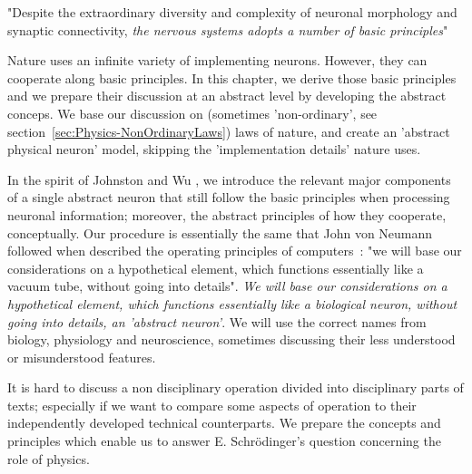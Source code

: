 
\quotationbox
{"Despite the extraordinary diversity and complexity of neuronal morphology and synaptic connectivity,
\textit{the nervous systems adopts a number of
 basic principles}"~\cite{JohnstonWuNeurophysiology:1995}
}


Nature uses an infinite variety of implementing neurons.
However, they can cooperate along basic principles.
In this chapter, we derive those basic principles and we prepare their discussion at an abstract level
by developing the abstract conceps.
We base our discussion on (sometimes 'non-ordinary',
see section~\ref{sec:Physics-NonOrdinaryLaws}) laws of nature,
and create an 'abstract physical neuron' model,
skipping the 'implementation details' nature uses.




In the spirit of Johnston and Wu \cite{JohnstonWuNeurophysiology:1995},
we introduce the relevant major components of a single abstract neuron that still follow the
{basic principles} when processing neuronal information;
moreover, the abstract principles of how they cooperate, conceptually.
Our procedure is essentially the same that John von Neumann followed
when described the operating principles of computers~\cite{EDVACreport1945}:
"we will base our considerations on a hypothetical element, which functions
essentially like a vacuum tube, without going into details". 
\textit{We will base our considerations on a hypothetical element, which functions
essentially like a biological neuron, without going into details, an 'abstract neuron'}. We will use the correct names from biology, physiology and neuroscience, sometimes discussing their less understood or misunderstood features.


It is hard to discuss a non disciplinary operation divided
into disciplinary parts of texts; especially if we want to
compare some aspects of operation to their independently
developed technical counterparts.
We prepare the concepts and principles which enable us to
answer E. Schrödinger's question concerning the role of physics.




 

